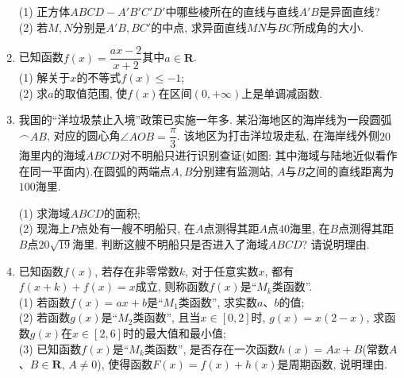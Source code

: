 \documentclass[10pt,a4paper]{article}
\begin{document}
\begin{enumerate}[1.]
\begin{center}
\end{center}
(1) 正方体$ABCD-A'B'C'D'$中哪些棱所在的直线与直线$A'B$是异面直线?\\
(2) 若$M,N$分别是$A'B,BC'$的中点, 求异面直线$MN$与$BC$所成角的大小.
\item 已知函数$f(x)=\dfrac{ax-2}{x+2}$其中$a\in \mathbf{R}$.\\
(1) 解关于$x$的不等式$f(x)\le -1$;\\
(2) 求$a$的取值范围, 使$f(x)$在区间$(0,+\infty)$上是单调减函数.
\item 我国的``洋垃圾禁止入境''政策已实施一年多. 某沿海地区的海岸线为一段圆弧$\frown{AB}$, 对应的圆心角$\angle AOB=\dfrac\pi 3$. 该地区为打击洋垃圾走私, 在海岸线外侧$20$海里内的海域$ABCD$对不明船只进行识别查证(如图: 其中海域与陆地近似看作在同一平面内).在圆弧的两端点$A,B$分别建有监测站, $A$与$B$之间的直线距离为$100$海里.
\begin{center}
\end{center}
(1) 求海域$ABCD$的面积;\\
(2) 现海上$P$点处有一艘不明船只, 在$A$点测得其距$A$点$40$海里, 在$B$点测得其距$B$点$20\sqrt {19}$海里. 判断这艘不明船只是否进入了海域$ABCD$? 请说明理由.
\item 已知函数$f(x)$, 若存在非零常数$k$, 对于任意实数$x$, 都有$f(x+k)+f(x)=x$成立, 则称函数$f(x)$是``$M_k$类函数''.\\
(1) 若函数$f(x)=ax+b$是``$M_1$类函数'', 求实数$a$、$b$的值;\\
(2) 若函数$g(x)$是``$M_2$类函数'', 且当$x\in [0,2]$时, $g(x)=x(2-x)$, 求函数$g(x)$在$x\in [2,6]$时的最大值和最小值;\\
(3) 已知函数$f(x)$是``$M_k$类函数'', 是否存在一次函数$h(x)=Ax+B$(常数$A$、$B\in \mathbf{R}$, $A\ne 0$), 使得函数$F(x)=f(x)+h(x)$是周期函数, 说明理由.

\end{enumerate}
\end{document}

